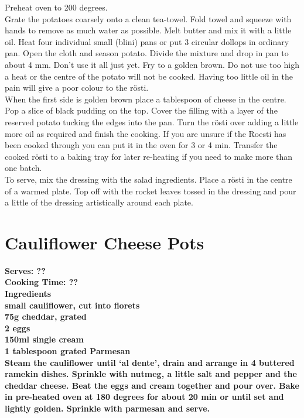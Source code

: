 \documentclass[18pt, oneside]{book}
\begin{document}
Preheat oven to 200 degrees. \\

Grate the potatoes coarsely onto a clean tea-towel. Fold towel and squeeze with hands to remove as much water as possible. Melt butter and mix it with a little oil. Heat four individual small (blini) pans or put 3 circular dollops in ordinary pan. Open the cloth and season potato. Divide the mixture and drop in pan to about 4 mm. Don’t use it all just yet. Fry to a golden brown. Do not use too high a heat or the centre of the potato will not be cooked. Having too little oil in the pain will give a poor colour to 
the r\"{o}sti. \\

When the first side is golden brown place a tablespoon of cheese in the centre. Pop a slice of black pudding on the top. Cover the filling with a layer of the reserved potato tucking the edges into the pan. Turn the r\"{o}sti over adding a little more oil as required and finish the cooking. If you are unsure if the Roesti has been cooked through you can put it in the oven for 3 or 4 min. Transfer the cooked r\"{o}sti 
to a baking tray for later re-heating if you need to make more than one batch. \\

To serve, mix the dressing with the salad ingredients. Place a r\"{o}sti in the centre of a warmed plate. Top off with the rocket leaves tossed in the dressing and pour a little of the dressing artistically around each plate. \\


\section{Cauliflower Cheese Pots}
\bf{Serves: ??} \\
\bf{Cooking Time: ??} \\

\bf{Ingredients} \normalfont \\
 small cauliflower, cut into florets \\
75g cheddar, grated \\
2 eggs \\
150ml single cream \\
1 tablespoon grated Parmesan \\

Steam the cauliflower until `al dente', drain and arrange in 4 buttered ramekin dishes.
Sprinkle with nutmeg, a little salt and pepper and the cheddar cheese. Beat the eggs and cream together and pour over. Bake in pre-heated oven at 180 degrees for about 20 min or until set and lightly golden. Sprinkle with parmesan and serve. 
\end{document}
